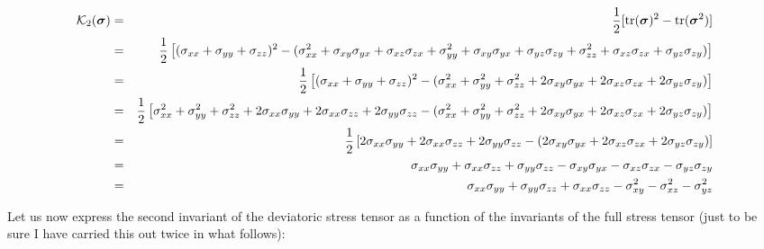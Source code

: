 \begin{eqnarray}
{\cal K}_2({\bm \sigma}) 
&=& \frac{1}{2}[{\rm tr}({\bm \sigma}) ^2 - {\rm tr}({\bm \sigma}^2)] \nonumber\\
&=& \frac12 \left[  (\sigma_{xx}+\sigma_{yy}+\sigma_{zz})^2  
- ( \sigma_{xx}^2 + \sigma_{xy}\sigma_{yx} + \sigma_{xz}\sigma_{zx}  
+\sigma_{yy}^2 + \sigma_{xy}\sigma_{yx} + \sigma_{yz}\sigma_{zy}
+\sigma_{zz}^2 + \sigma_{xz}\sigma_{zx} + \sigma_{yz}\sigma_{zy}
) \right] \nonumber\\
&=& \frac12 \left[  (\sigma_{xx}+\sigma_{yy}+\sigma_{zz})^2  
- ( \sigma_{xx}^2 +\sigma_{yy}^2 +\sigma_{zz}^2
+ 2\sigma_{xy}\sigma_{yx} + 2\sigma_{xz}\sigma_{zx}  + 2\sigma_{yz}\sigma_{zy} ) \right] \nonumber\\
&=& \frac12 \left[  
\sigma_{xx}^2 + \sigma_{yy}^2 + \sigma_{zz}^2
+2 \sigma_{xx}\sigma_{yy}
+2 \sigma_{xx}\sigma_{zz}
+ 2 \sigma_{yy}\sigma_{zz}
- ( \sigma_{xx}^2 +\sigma_{yy}^2 +\sigma_{zz}^2
+ 2\sigma_{xy}\sigma_{yx} + 2\sigma_{xz}\sigma_{zx}  + 2\sigma_{yz}\sigma_{zy} ) \right] \nonumber\\
&=& \frac12 \left[  
2 \sigma_{xx}\sigma_{yy}
+2 \sigma_{xx}\sigma_{zz}
+ 2 \sigma_{yy}\sigma_{zz}
- ( 2\sigma_{xy}\sigma_{yx} + 2\sigma_{xz}\sigma_{zx}  + 2\sigma_{yz}\sigma_{zy} ) \right] \nonumber\\
&=& 
\sigma_{xx}\sigma_{yy} + \sigma_{xx}\sigma_{zz} + \sigma_{yy}\sigma_{zz}
- \sigma_{xy}\sigma_{yx} - \sigma_{xz}\sigma_{zx}  - \sigma_{yz}\sigma_{zy} 
\\
&=& \sigma_{xx}\sigma_{yy}+\sigma_{yy}\sigma_{zz}+\sigma_{xx}\sigma_{zz}
-\sigma_{xy}^2 -\sigma_{xz}^2 -\sigma_{yz}^2 
\end{eqnarray}











\newpage
Let us now express the second invariant of the deviatoric stress tensor 
as a function of the invariants of the full stress tensor (just to be sure
I have carried this out twice in what follows): 

